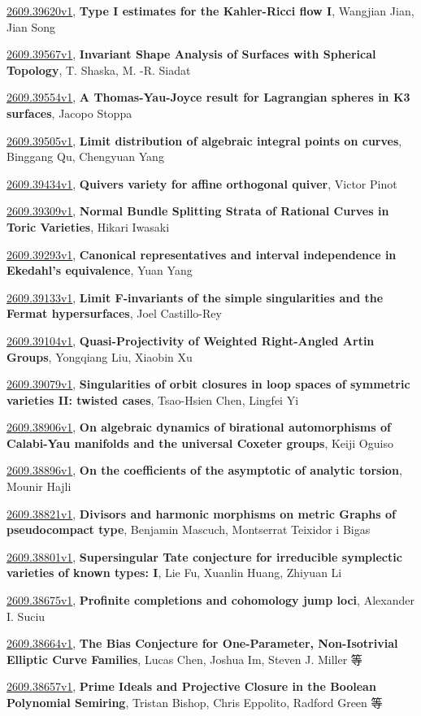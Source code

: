 \documentclass[9pt, a4paper]{article}
\theoremstyle{plain}
\theoremstyle{definition}
\theoremstyle{remark}
\newcommand{\arxiv}[3]{\href{https://arxiv.org/abs/#1}{#1}, \textbf{\textcolor{arxivblue}{#2}}, #3}
\begin{document}
\arxiv{2609.39620v1}{Type I estimates for the Kahler-Ricci flow I}{Wangjian Jian, Jian Song}

\arxiv{2609.39567v1}{Invariant Shape Analysis of Surfaces with Spherical Topology}{T. Shaska, M. -R. Siadat}

\arxiv{2609.39554v1}{A Thomas-Yau-Joyce result for Lagrangian spheres in K3 surfaces}{Jacopo Stoppa}

\arxiv{2609.39505v1}{Limit distribution of algebraic integral points on curves}{Binggang Qu, Chengyuan Yang}

\arxiv{2609.39434v1}{Quivers variety for affine orthogonal quiver}{Victor Pinot}

\arxiv{2609.39309v1}{Normal Bundle Splitting Strata of Rational Curves in Toric Varieties}{Hikari Iwasaki}

\arxiv{2609.39293v1}{Canonical representatives and interval independence in Ekedahl's equivalence}{Yuan Yang}

\arxiv{2609.39133v1}{Limit F-invariants of the simple singularities and the Fermat hypersurfaces}{Joel Castillo-Rey}

\arxiv{2609.39104v1}{Quasi-Projectivity of Weighted Right-Angled Artin Groups}{Yongqiang Liu, Xiaobin Xu}

\arxiv{2609.39079v1}{Singularities of orbit closures in loop spaces of symmetric varieties II: twisted cases}{Tsao-Hsien Chen, Lingfei Yi}

\arxiv{2609.38906v1}{On algebraic dynamics of birational automorphisms of Calabi-Yau manifolds and the universal Coxeter groups}{Keiji Oguiso}

\arxiv{2609.38896v1}{On the coefficients of the asymptotic of analytic torsion}{Mounir Hajli}

\arxiv{2609.38821v1}{Divisors and harmonic morphisms on metric Graphs of pseudocompact type}{Benjamin Mascuch, Montserrat Teixidor i Bigas}

\arxiv{2609.38801v1}{Supersingular Tate conjecture for irreducible symplectic varieties of known types: I}{Lie Fu, Xuanlin Huang, Zhiyuan Li}

\arxiv{2609.38675v1}{Profinite completions and cohomology jump loci}{Alexander I. Suciu}

\arxiv{2609.38664v1}{The Bias Conjecture for One-Parameter, Non-Isotrivial Elliptic Curve Families}{Lucas Chen, Joshua Im, Steven J. Miller 等}

\arxiv{2609.38657v1}{Prime Ideals and Projective Closure in the Boolean Polynomial Semiring}{Tristan Bishop, Chris Eppolito, Radford Green 等}
\end{document}
